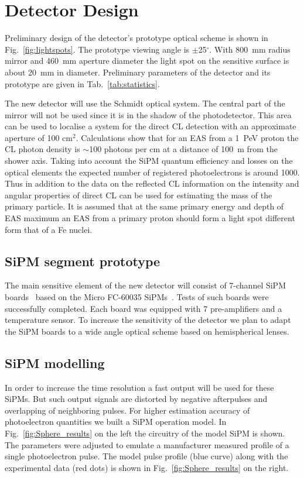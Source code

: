 \documentclass[a4paper]{jpconf}
\begin{document}
\section{Detector Design}
Preliminary design of the detector's prototype optical scheme is shown in Fig.~\ref{fig:lightspots}. The prototype viewing angle is $\pm$25$^\circ$. With 800~mm radius mirror and 460~mm aperture diameter the light spot on the sensitive surface is about 20~mm in diameter. Preliminary parameters of the detector and its prototype are given in Tab.~\ref{tab:statistics}.

The new detector will use the Schmidt optical system. The central part of the mirror will not be used since it is in the shadow of the photodetector. This area can be used to localise a system for the direct CL detection with an approximate aperture of 100 cm$^2$. Calculations show that for an EAS from a 1~PeV proton the CL photon density is $\sim$100 photons per cm at a distance of 100~m from the shower axis. Taking into account the SiPM quantum efficiency and losses on the optical elements the expected number of registered photoelectrons is around 1000.  Thus in addition to the data on the reflected CL information on the intensity and angular properties of direct CL can be used for estimating the mass of the primary particle. It is assumed that at the same primary energy and depth of EAS maximum an EAS from a primary proton should form a light spot different form that of a Fe nuclei.

\subsection{SiPM segment prototype }
The main sensitive element of the new detector will consist of 7-channel SiPM boards~\cite{TunkaSIT2020} based on the Micro FC-60035 SiPMs~\cite{SiPM_datasheet}. Tests of such boards were successfully completed. Each board was equipped with 7 pre-amplifiers and a temperature sensor. To increase the sensitivity of the detector we plan to adapt the SiPM boards to a wide angle optical scheme based on hemispherical lenses.

\subsection{SiPM modelling}
In order to increase the time resolution a fast output will be used for these SiPMs. But such output signals are distorted by negative afterpulses and overlapping of neighboring pulses. For higher estimation accuracy of photoelectron quantities we built a SiPM operation model. In Fig.~\ref{fig:Sphere_results} on the left the circuitry of the model SiPM is shown. The parameters were adjusted to emulate a manufacturer measured profile of a single photoelectron pulse. The model pulse profile (blue curve) along with the experimental data (red dots) is shown in Fig.~\ref{fig:Sphere_results} on the right.
\end{document}
